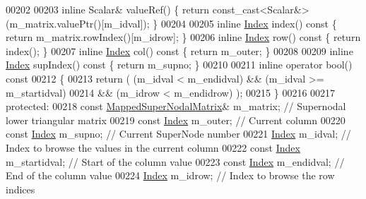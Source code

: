 \begin{DoxyCode}
00202     
00203     \textcolor{keyword}{inline} Scalar& valueRef() \{ \textcolor{keywordflow}{return} \textcolor{keyword}{const\_cast<}Scalar&\textcolor{keyword}{>}(m\_matrix.valuePtr()[m\_idval]); \}
00204     
00205     \textcolor{keyword}{inline} \hyperlink{namespace_eigen_a62e77e0933482dafde8fe197d9a2cfde}{Index} index()\textcolor{keyword}{ const }\{ \textcolor{keywordflow}{return} m\_matrix.rowIndex()[m\_idrow]; \}
00206     \textcolor{keyword}{inline} \hyperlink{namespace_eigen_a62e77e0933482dafde8fe197d9a2cfde}{Index} row()\textcolor{keyword}{ const }\{ \textcolor{keywordflow}{return} index(); \}
00207     \textcolor{keyword}{inline} \hyperlink{namespace_eigen_a62e77e0933482dafde8fe197d9a2cfde}{Index} col()\textcolor{keyword}{ const }\{ \textcolor{keywordflow}{return} m\_outer; \}
00208     
00209     \textcolor{keyword}{inline} \hyperlink{namespace_eigen_a62e77e0933482dafde8fe197d9a2cfde}{Index} supIndex()\textcolor{keyword}{ const }\{ \textcolor{keywordflow}{return} m\_supno; \}
00210     
00211     \textcolor{keyword}{inline} \textcolor{keyword}{operator} bool()\textcolor{keyword}{ const }
00212 \textcolor{keyword}{    }\{ 
00213       \textcolor{keywordflow}{return} ( (m\_idval < m\_endidval) && (m\_idval >= m\_startidval)
00214                 && (m\_idrow < m\_endidrow) );
00215     \}
00216     
00217   \textcolor{keyword}{protected}:
00218     \textcolor{keyword}{const} \hyperlink{group___sparse_l_u___module_class_eigen_1_1internal_1_1_mapped_super_nodal_matrix}{MappedSuperNodalMatrix}& m\_matrix; \textcolor{comment}{// Supernodal lower triangular matrix }
00219     \textcolor{keyword}{const} \hyperlink{namespace_eigen_a62e77e0933482dafde8fe197d9a2cfde}{Index} m\_outer;                    \textcolor{comment}{// Current column }
00220     \textcolor{keyword}{const} \hyperlink{namespace_eigen_a62e77e0933482dafde8fe197d9a2cfde}{Index} m\_supno;                    \textcolor{comment}{// Current SuperNode number}
00221     \hyperlink{namespace_eigen_a62e77e0933482dafde8fe197d9a2cfde}{Index} m\_idval;                          \textcolor{comment}{// Index to browse the values in the current column}
00222     \textcolor{keyword}{const} \hyperlink{namespace_eigen_a62e77e0933482dafde8fe197d9a2cfde}{Index} m\_startidval;               \textcolor{comment}{// Start of the column value}
00223     \textcolor{keyword}{const} \hyperlink{namespace_eigen_a62e77e0933482dafde8fe197d9a2cfde}{Index} m\_endidval;                 \textcolor{comment}{// End of the column value}
00224     \hyperlink{namespace_eigen_a62e77e0933482dafde8fe197d9a2cfde}{Index} m\_idrow;                          \textcolor{comment}{// Index to browse the row indices }

\end{DoxyCode}

